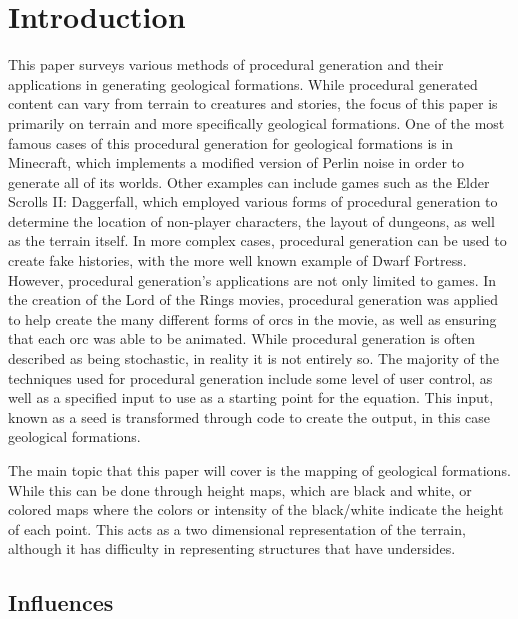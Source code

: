 \documentclass[10pt]{report}
\begin{document}
	\clearpage
	
	\tableofcontents
	
	\clearpage
	
	\let\clearpage\relax
	\chapter{Introduction}
	
		This paper surveys various methods of procedural generation and their applications in generating geological formations. While procedural generated content can vary from terrain to creatures and stories, the focus of this paper is primarily on terrain and more specifically geological formations. One of the most famous cases of this procedural generation for geological formations is in Minecraft, which implements a modified version of Perlin noise in order to generate all of its worlds. Other examples can include games such as the Elder Scrolls II: Daggerfall, which employed various forms of procedural generation to determine the location of non-player characters, the layout of dungeons, as well as the terrain itself. In more complex cases, procedural generation can be used to create fake histories, with the more well known example of Dwarf Fortress. However, procedural generation's applications are not only limited to games. In the creation of the Lord of the Rings movies, procedural generation was applied to help create the many different forms of orcs in the movie, as well as ensuring that each orc was able to be animated. While procedural generation is often described as being stochastic, in reality it is not entirely so. The majority of the techniques used for procedural generation include some level of user control, as well as a specified input to use as a starting point for the equation. This input, known as a seed is transformed through code to create the output, in this case geological formations.
		
		The main topic that this paper will cover is the mapping of geological formations. While this can be done through height maps, which are black and white, or colored maps where the colors or intensity of the black/white indicate the height of each point. This acts as a two dimensional representation of the terrain, although it has difficulty in representing structures that have undersides.
		
		\section{Influences}
		
\end{document}
